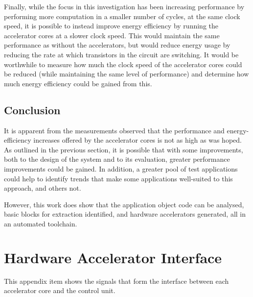 \documentclass{UoYCSproject}
\begin{document}
Finally, while the focus in this investigation has been increasing performance by performing more
computation in a smaller number of cycles, at the same clock speed, it is possible to instead improve
energy efficiency by running the accelerator cores at a slower clock speed. This would maintain the same
performance as without the accelerators, but would reduce energy usage by reducing the rate at which
transistors in the circuit are switching. It would be worthwhile to measure how much the clock speed
of the accelerator cores could be reduced (while maintaining the same level of performance) and determine
how much energy efficiency could be gained from this.

\section{Conclusion}

It is apparent from the measurements observed that the performance and energy-efficiency increases
offered by the accelerator cores is not as high as was hoped. As outlined in the previous section,
it is possible that with some improvements, both to the design of the system and to its evaluation,
greater performance improvements could be gained. In addition, a greater pool of test applications
could help to identify trends that make some applications well-suited to this approach, and others not.

However, this work does show that the application object code can be analysed, basic blocks for extraction
identified, and hardware accelerators generated, all in an automated toolchain.

\appendix

\chapter{Hardware Accelerator Interface}
\label{appendix:interface}

This appendix item shows the signals that form the interface between each accelerator core and the control unit.
\end{document}
